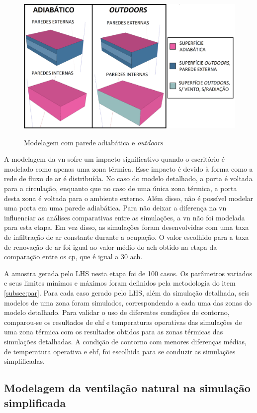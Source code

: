 \begin{figure}[h]
	\centering
	\caption{Modelagem com parede adiabática e \textit{outdoors}}
	\includegraphics[width=.7\linewidth]{img/adiabatic_outdoors2.png}
	\label{fig:adiabatic_outdoors}
\end{figure}


A modelagem da \acrlong{vn} sofre um impacto significativo quando o escritório é modelado como apenas uma zona térmica.
Esse impacto é devido à forma como a rede de fluxo de ar é distribuída. No caso do modelo detalhado, a porta é voltada para a circulação, enquanto que no caso de uma única zona térmica, a porta desta zona é voltada para o ambiente externo. 
Além disso, não é possível modelar uma porta em uma parede adiabática. Para não deixar a diferença na \acrlong{vn} influenciar as análises comparativas entre as simulações, a \acrlong{vn} não foi modelada para esta etapa.
Em vez disso, as simulações foram desenvolvidas com uma taxa de infiltração de ar constante durante a ocupação. O valor escolhido para a taxa de renovação de ar foi igual ao valor médio do \acrshort{ach} obtido na etapa da comparação entre os \acrshort{cp}, que é igual a 30 \acrshort{ach}.

A amostra gerada pelo LHS nesta etapa foi de 100 casos.
Os parâmetros variados e seus limites mínimos e máximos foram definidos pela metodologia do item \ref{subsec:par}.
Para cada caso gerado pelo LHS, além da simulação detalhada, seis modelos de uma zona foram simulados, correspondendo a cada uma das zonas do modelo detalhado.
Para validar o uso de diferentes condições de contorno, comparou-se os resultados de \acrshort{ehf} e temperaturas operativas das simulações de uma zona térmica com os resultados obtidos para as zonas térmicas das simulações detalhadas.
A condição de contorno com menores diferenças médias, de temperatura operativa e \acrshort{ehf}, foi escolhida para se conduzir as simulações simplificadas.

\subsection*{Modelagem da ventilação natural na simulação simplificada}

